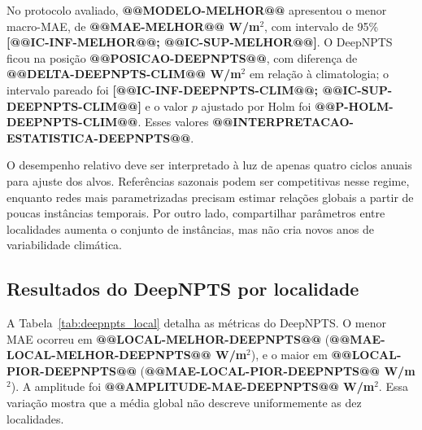 \documentclass[10pt,conference,a4paper]{IEEEtran}
\begin{document}
No protocolo avaliado, \textbf{@@MODELO-MELHOR@@} apresentou o menor
macro-MAE, de \textbf{@@MAE-MELHOR@@ W/m$^2$}, com intervalo de 95\%
\textbf{[@@IC-INF-MELHOR@@; @@IC-SUP-MELHOR@@]}. O DeepNPTS ficou na posição
\textbf{@@POSICAO-DEEPNPTS@@}, com diferença de
\textbf{@@DELTA-DEEPNPTS-CLIM@@ W/m$^2$} em relação à climatologia; o intervalo
pareado foi \textbf{[@@IC-INF-DEEPNPTS-CLIM@@;
@@IC-SUP-DEEPNPTS-CLIM@@]} e o valor $p$ ajustado por Holm foi
\textbf{@@P-HOLM-DEEPNPTS-CLIM@@}. Esses valores
\textbf{@@INTERPRETACAO-ESTATISTICA-DEEPNPTS@@}.

O desempenho relativo deve ser interpretado à luz de apenas quatro ciclos
anuais para ajuste dos alvos. Referências sazonais podem ser competitivas nesse
regime, enquanto redes mais parametrizadas precisam estimar relações globais a
partir de poucas instâncias temporais. Por outro lado, compartilhar parâmetros
entre localidades aumenta o conjunto de instâncias, mas não cria novos anos de
variabilidade climática.

\subsection{Resultados do DeepNPTS por localidade}

A Tabela~\ref{tab:deepnpts_local} detalha as métricas do DeepNPTS. O menor MAE
ocorreu em \textbf{@@LOCAL-MELHOR-DEEPNPTS@@}
(\textbf{@@MAE-LOCAL-MELHOR-DEEPNPTS@@ W/m$^2$}), e o maior em
\textbf{@@LOCAL-PIOR-DEEPNPTS@@}
(\textbf{@@MAE-LOCAL-PIOR-DEEPNPTS@@ W/m$^2$}). A amplitude foi
\textbf{@@AMPLITUDE-MAE-DEEPNPTS@@ W/m$^2$}. Essa variação mostra que a média
global não descreve uniformemente as dez localidades.
\end{document}
